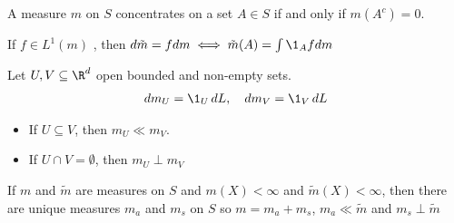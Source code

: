 \begin{definition}
	A measure $m$ on $S$ concentrates on a set $A \in S$ if and only if $m(A^{c}) = 0$.
\end{definition}

\begin{notation}
	If $f \in L^{1} (m)$ , then $d\tilde{m} = f dm \iff \tilde{m} (A) = \int \1_{A}f dm$
\end{notation}


\begin{example}
	Let $U, V \subseteq  \R^{d}$ open bounded and non-empty sets.
	\begin{align*}
		d m_{U} = \1_{U} \, dL, \quad d m_{V} = \1_{V} \, dL
	\end{align*}
	\begin{itemize}
		\item If $U \subseteq V$, then $m_{U} \ll m_{V}$.
		\item If $U \cap V = \emptyset$, then $m_{U} \perp m_{V}$
	\end{itemize}
\end{example}

\begin{theorem}
	If $m$ and $\tilde m$ are measures on  $S$ and  $m(X) < \infty$ and $\tilde m (X) < \infty$, then there are unique measures $m_{a}$ and $m_{s}$ on $S$ so $m = m_{a} + m_{s}$, $m_{a} \ll \tilde m$ and $m_{s} \perp \tilde m$
\end{theorem}

